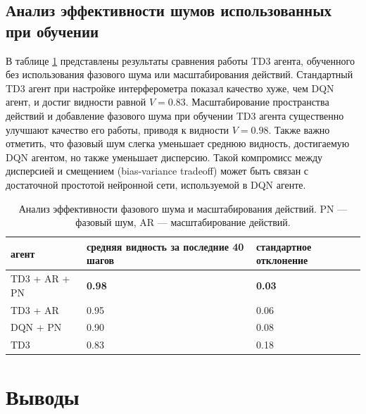\subsection{Анализ эффективности шумов использованных при обучении}

В таблице \ref{tab:abl_td3} представлены результаты сравнения работы TD3 агента, обученного без использования фазового шума или масштабирования действий. Стандартный TD3 агент при настройке интерферометра показал качество хуже, чем DQN агент, и достиг видности равной $V = 0.83$. Масштабирование пространства действий и добавление фазового шума при обучении TD3 агента существенно улучшают качество его работы, приводя к видности $V = 0.98$. Также важно отметить, что фазовый шум слегка уменьшает среднюю видность, достигаемую DQN агентом, но также уменьшает дисперсию. Такой компромисс между дисперсией и смещением (bias-variance tradeoff) может быть связан с достаточной простотой нейронной сети, используемой в DQN агенте. 

\begin{table} [htbp]
    \centering
    \begin{threeparttable}
        \caption{Анализ эффективности фазового шума и масштабирования действий. PN --- фазовый шум, AR --- масштабирование действий.}\label{tab:abl_td3}
        \begin{tabular}{| p{4cm} || p{6cm} || p{6cm} |}
            \hline
            \hline
            агент & средняя видность за последние 40 шагов & стандартное отклонение \\
            \hline
            TD3 + AR + PN & \textbf{0.98} & \textbf{0.03} \\
            TD3 + AR & 0.95 & 0.06\\
            DQN + PN & 0.90 & 0.08\\
            TD3& 0.83 & 0.18\\
            \hline
            \hline
        \end{tabular}
    \end{threeparttable}
\end{table}

\section{Выводы}

